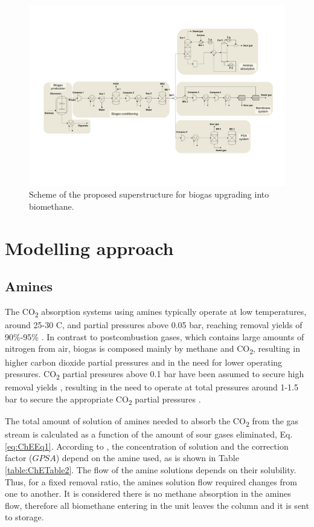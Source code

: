 \begin{refsection}[referencesCh7]
\begin{figure}[h]
	\centering
	\includegraphics[width=1\linewidth, trim={3cm 7cm 3cm 5cm},clip]{gfx/Chapter7/Figure2.pdf} 
	\caption{Scheme of the proposed superstructure for biogas upgrading into biomethane.}
	\label{fig:ChEFig1}
\end{figure}

\section{Modelling approach} \label{section:SuppMatPaperCO2Section2}
\subsection{Amines} \label{section:SuppMatAmines}
The CO\textsubscript{2} absorption systems using amines typically operate at low temperatures, around 25-30 \textdegree C, and partial pressures above 0.05 bar, reaching removal yields of 90\%-95\% \citep{zhang2013modeling}. In contrast to postcombustion gases, which contains large amounts of nitrogen from air, biogas is composed mainly by methane and CO\textsubscript{2}, resulting in higher carbon dioxide partial pressures and in the need for lower operating pressures. CO\textsubscript{2} partial pressures above 0.1 bar have been assumed to secure high removal yields \citep{zhang2013modeling}, resulting in the need to operate at total pressures around 1-1.5 bar to secure the appropriate CO\textsubscript{2} partial pressures \citep{movagharnejad2011simulation, xue2017comparative}. 

The total amount of solution of amines needed to absorb the CO\textsubscript{2} from the gas stream is calculated as a function of the amount of sour gases eliminated, Eq. \ref{eq:ChEEq1}. According to \citet{2012gpsa}, the concentration of solution and the correction factor ($GPSA$) depend on the amine used, as is shown in Table \ref{table:ChETable2}. The flow of the amine solutions depends on their solubility. Thus, for a fixed removal ratio, the amines solution flow required changes from one to another. It is considered there is no methane absorption in the amines flow, therefore all biomethane entering in the unit leaves the column and it is sent to storage.


\end{refsection}
